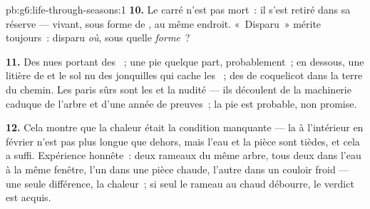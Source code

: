 \begin{solution}{pb:g6:life-through-seasons:1}
\textbf{10.} Le carré n'est pas mort~: il s'est retiré dans sa
réserve --- vivant, sous forme de , au même endroit.
«~Disparu~» mérite toujours~: disparu \emph{où}, sous quelle
\emph{forme}~?

\textbf{11.} Des  nues portant des ~; une pie
quelque part, probablement~; en dessous, une litière de  et
le sol nu des jonquilles qui cache les ~; des  de
coquelicot dans la terre du chemin. Les paris sûrs sont les
 et la nudité --- ils découlent de la machinerie caduque de
l'arbre et d'une année de preuves~; la pie est probable, non
promise.

\textbf{12.} Cela montre que la chaleur était la condition
manquante --- la  à l'intérieur en février n'est pas plus
longue que dehors, mais l'eau et la pièce sont tièdes, et cela a
suffi. Expérience honnête~: deux rameaux du même arbre, tous deux
dans l'eau à la même fenêtre, l'un dans une pièce chaude, l'autre
dans un couloir froid --- une seule différence, la chaleur~; si seul
le rameau au chaud débourre, le verdict est acquis.
\end{solution}
